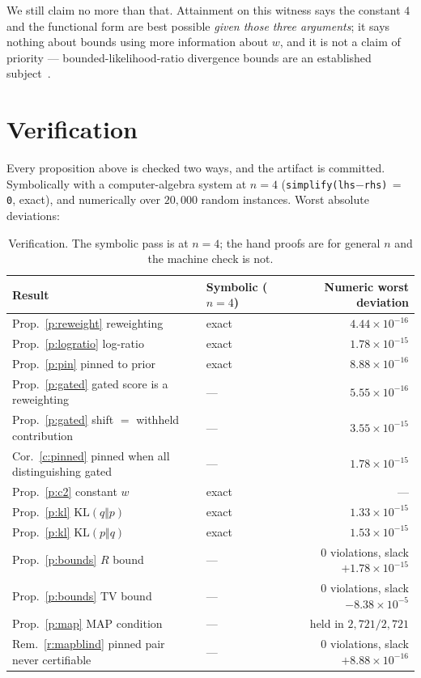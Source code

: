 \documentclass[11pt,a4paper]{article}
\newcommand{\code}[1]{\texttt{\small #1}}
\theoremstyle{definition}
\begin{document}
We still claim no more than that. Attainment on this witness says the constant
$4$ and the functional form are best possible \emph{given those three
arguments}; it says nothing about bounds using more information about $w$, and
it is not a claim of priority --- bounded-likelihood-ratio divergence bounds
are an established subject~\cite{rukhin1997bounded}.

\section{Verification}

Every proposition above is checked two ways, and the artifact is committed.
Symbolically with a computer-algebra system at $n=4$
(\code{simplify(lhs$-$rhs)$\,=\,$0}, exact), and numerically over $20{,}000$
random instances. Worst absolute deviations:

\begin{table}[h]
\centering
\small
\begin{tabular}{llr}
\toprule
Result & Symbolic ($n=4$) & Numeric worst deviation \\
\midrule
Prop.~\ref{p:reweight} reweighting          & exact & $4.44\times10^{-16}$ \\
Prop.~\ref{p:logratio} log-ratio            & exact & $1.78\times10^{-15}$ \\
Prop.~\ref{p:pin} pinned to prior           & exact & $8.88\times10^{-16}$ \\
Prop.~\ref{p:gated} gated score is a reweighting & --- & $5.55\times10^{-16}$ \\
Prop.~\ref{p:gated} shift $=$ withheld contribution & --- & $3.55\times10^{-15}$ \\
Cor.~\ref{c:pinned} pinned when all distinguishing gated & --- & $1.78\times10^{-15}$ \\
Prop.~\ref{p:c2} constant $w$               & exact & --- \\
Prop.~\ref{p:kl} $\mathrm{KL}(q\Vert p)$    & exact & $1.33\times10^{-15}$ \\
Prop.~\ref{p:kl} $\mathrm{KL}(p\Vert q)$    & exact & $1.53\times10^{-15}$ \\
Prop.~\ref{p:bounds} $R$ bound              & ---   & 0 violations, slack $+1.78\times10^{-15}$ \\
Prop.~\ref{p:bounds} TV bound               & ---   & 0 violations, slack $-8.38\times10^{-5}$ \\
Prop.~\ref{p:map} MAP condition             & ---   & held in $2{,}721/2{,}721$ \\
Rem.~\ref{r:mapblind} pinned pair never certifiable & --- & 0 violations, slack $+8.88\times10^{-16}$ \\
\bottomrule
\end{tabular}
\caption{Verification. The symbolic pass is at $n=4$; the hand proofs are for
general $n$ and the machine check is not.}
\label{tab:verify}
\end{table}
\end{document}
